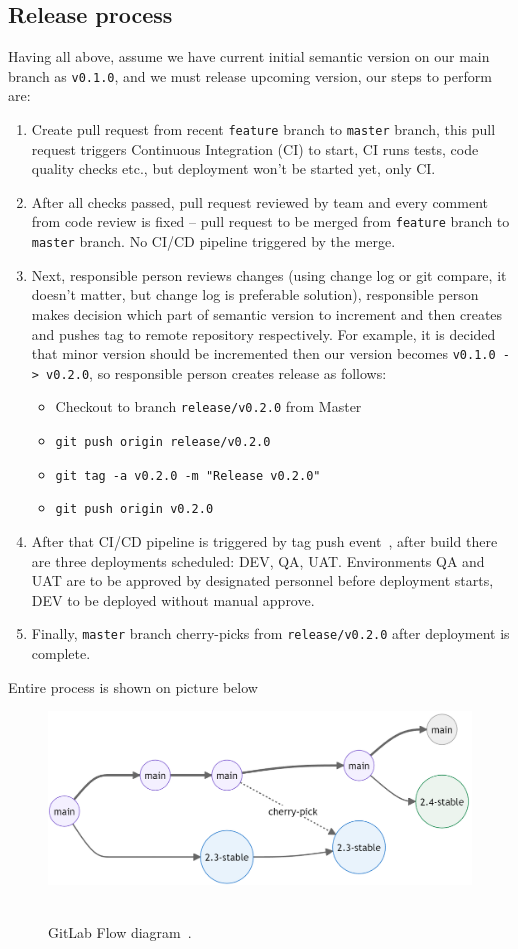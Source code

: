 \subsection{Release process}
Having all above, assume we have current initial semantic version on our main branch as \texttt{v0.1.0},
and we must release upcoming version, our steps to perform are:
\begin{enumerate}
    \item Create pull request from recent \texttt{feature} branch to \texttt{master} branch, this pull request triggers
    Continuous Integration (CI) to start, CI runs tests, code quality checks etc.,
    but deployment won't be started yet, only CI\@.
    \item After all checks passed, pull request reviewed by team and every comment from code review is fixed -- pull
    request to be merged from \texttt{feature} branch to \texttt{master} branch.
    No CI/CD pipeline triggered by the merge.
    \item Next, responsible person reviews changes
    (using change log or git compare, it doesn't matter, but change log is preferable solution),
    responsible person makes decision which part of semantic version to increment and then creates
    and pushes tag to remote repository respectively.
    For example, it is decided that minor version should be incremented then our version becomes
    \texttt{v0.1.0 -> v0.2.0}, so responsible person creates release as follows:
    \begin{itemize}
        \item Checkout to branch \texttt{release/v0.2.0} from Master
        \item \texttt{git push origin release/v0.2.0}
        \item \texttt{git tag -a v0.2.0 -m "Release v0.2.0"}
        \item \texttt{git push origin v0.2.0}
    \end{itemize}
    \item After that CI/CD pipeline is triggered by tag push event~\cite{AzurePipelinesTriggers},
    after build there are three deployments scheduled: DEV, QA, UAT\@.
    Environments QA and UAT are to be approved by designated personnel before deployment starts,
    DEV to be deployed without manual approve.
    \item Finally, \texttt{master} branch cherry-picks from \texttt{release/v0.2.0} after deployment is complete.
\end{enumerate}
Entire process is shown on picture below
\begin{figure}[H]
    \centering
    \includegraphics[width=1\textwidth]{../img/GitLab_Flow}
    ~\caption{GitLab Flow diagram~\cite{GitLabFlow}.}
\end{figure}